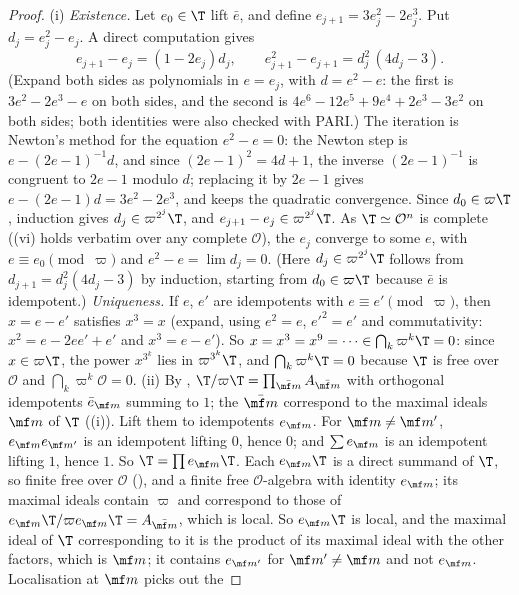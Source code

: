 \begin{proof}
(i) \emph{Existence.} Let $e_0\in\T$ lift $\bar e$, and define $e_{j+1}=3e_j^2-2e_j^3$. Put $d_j=e_j^2-e_j$. A direct computation gives
\[
e_{j+1}-e_j=(1-2e_j)d_j,\qquad e_{j+1}^2-e_{j+1}=d_j^2\,(4d_j-3).
\]
(Expand both sides as polynomials in $e=e_j$, with $d=e^2-e$: the first is $3e^2-2e^3-e$ on both sides, and the second is
$4e^6-12e^5+9e^4+2e^3-3e^2$ on both sides; both identities were also checked with PARI.) The iteration is Newton's method for the
equation $e^2-e=0$: the Newton step is $e-(2e-1)^{-1}d$, and since $(2e-1)^2=4d+1$, the inverse $(2e-1)^{-1}$ is congruent to $2e-1$ modulo $d$;
replacing it by $2e-1$ gives $e-(2e-1)d=3e^2-2e^3$, and keeps the quadratic convergence. Since
$d_0\in\varpi\T$, induction gives $d_j\in\varpi^{2^j}\T$, and $e_{j+1}-e_j\in\varpi^{2^j}\T$. As $\T\simeq\mathcal O^n$ is complete
((vi) holds verbatim over any complete $\mathcal O$), the $e_j$ converge to some $e$, with $e\equiv e_0\pmod\varpi$ and $e^2-e=\lim d_j=0$.
(Here $d_j\in\varpi^{2^j}\T$ follows from $d_{j+1}=d_j^2(4d_j-3)$ by induction, starting from $d_0\in\varpi\T$ because $\bar e$ is idempotent.)
\emph{Uniqueness.} If $e$, $e'$ are idempotents with $e\equiv e'\pmod\varpi$, then $x=e-e'$ satisfies $x^3=x$ (expand, using $e^2=e$, $e'^2=e'$ and
commutativity: $x^2=e-2ee'+e'$ and $x^3=e-e'$). So $x=x^3=x^9=\cdots\in\bigcap_k\varpi^k\T=0$: since $x\in\varpi\T$, the power $x^{3^k}$ lies in
$\varpi^{3^k}\T$, and $\bigcap_k\varpi^k\T=0$ because $\T$ is free over $\mathcal O$ and $\bigcap_k\varpi^k\mathcal O=0$.
(ii) By , $\T/\varpi\T=\prod_{\bar{\mf m}}A_{\bar{\mf m}}$ with orthogonal idempotents $\bar e_{\mf m}$ summing to $1$; the $\bar{\mf m}$ correspond to the
maximal ideals $\mf m$ of $\T$ ((i)). Lift them to idempotents $e_{\mf m}$. For $\mf m\ne\mf m'$, $e_{\mf m}e_{\mf m'}$ is an
idempotent lifting $0$, hence $0$; and $\sum e_{\mf m}$ is an idempotent lifting $1$, hence $1$. So $\T=\prod e_{\mf m}\T$. Each $e_{\mf m}\T$ is a direct summand of $\T$, so
finite free over $\mathcal O$ (), and a finite free $\mathcal O$-algebra with identity $e_{\mf m}$; its maximal ideals contain $\varpi$ and
correspond to those of $e_{\mf m}\T/\varpi e_{\mf m}\T=A_{\bar{\mf m}}$, which is local. So $e_{\mf m}\T$ is local, and the maximal ideal of $\T$ corresponding to it is the
product of its maximal ideal with the other factors, which is $\mf m$; it contains $e_{\mf m'}$ for $\mf m'\ne\mf m$ and not $e_{\mf m}$. Localisation at $\mf m$ picks out the

\end{proof}
